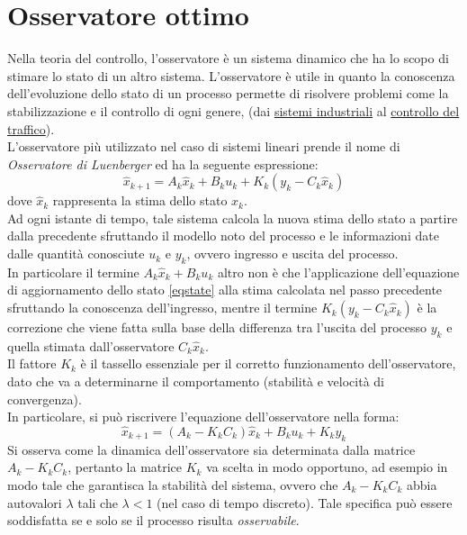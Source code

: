 \section{Osservatore ottimo}
Nella teoria del controllo, l'osservatore è un sistema dinamico che ha lo scopo di stimare lo stato di un altro sistema. L'osservatore è utile in quanto la conoscenza dell'evoluzione dello stato di un processo permette di risolvere problemi come la stabilizzazione e il controllo di ogni genere, (dai \href {https://www.researchgate.net/publication/260398837_Industrial_Applications_of_the_Kalman_Filter_A_Review}{sistemi industriali} al \href{https://www.researchgate.net/publication/221908836_Kalman_Filter_Applications_for_Traffic_Management}{controllo del traffico}).\\

L'osservatore più utilizzato nel caso di sistemi lineari prende il nome di \textit{Osservatore di Luenberger}\cite{bolzern} ed ha la seguente espressione:
\begin{equation}
\label{obsv}
\hat{x}_{k+1}=A_k\hat{x}_k+B_ku_k+K_k(y_k-C_k\hat{x}_k)
\end{equation}
dove $\hat{x}_k$ rappresenta la stima dello stato $x_k$.\\
Ad ogni istante di tempo, tale sistema calcola la nuova stima dello stato a partire dalla precedente sfruttando il modello noto del processo e le informazioni date dalle quantità conosciute $u_k$ e $y_k$, ovvero ingresso e uscita del processo. \\
In particolare il termine $A_k\hat{x}_k+B_ku_k$ altro non è che l'applicazione dell'equazione di aggiornamento dello stato \eqref{eqstate} alla stima calcolata nel passo precedente sfruttando la conoscenza dell'ingresso, mentre il termine $K_k(y_k-C_k\hat{x}_k)$ è la correzione che viene fatta sulla base della differenza tra l'uscita del processo $y_k$ e quella stimata dall'osservatore $C_k\hat{x}_k$.\\
Il fattore $K_k$ è il tassello essenziale per il corretto funzionamento dell'osservatore, dato che va a determinarne il comportamento (stabilità e velocità di convergenza).\\
In particolare, si può riscrivere l'equazione dell'osservatore nella forma:
\begin{equation}
\label{obsv2}
\hat{x}_{k+1}=(A_k-K_kC_k)\hat{x}_k+B_ku_k+K_ky_k
\end{equation}
Si osserva come la dinamica dell'osservatore sia determinata dalla matrice $A_k-K_kC_k$, pertanto la matrice $K_k$ va scelta in modo opportuno, ad esempio in modo tale che garantisca la stabilità del sistema, ovvero che $A_k-K_kC_k$ abbia autovalori $\lambda$ tali che $\lambda<1$ (nel caso di tempo discreto). Tale specifica può essere soddisfatta se e solo se il processo risulta \textit{osservabile}.\\
